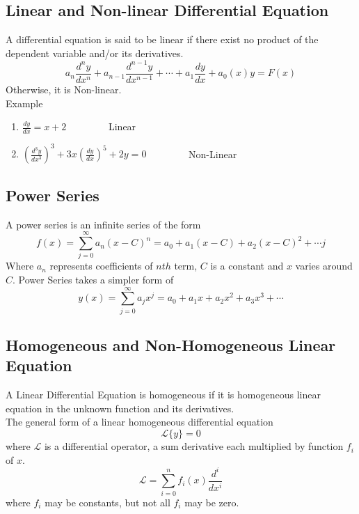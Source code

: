 \documentclass[12pt]{report}
\newcommand{\dsp}{\displaystyle}
\newcommand{\NI}{\noindent}
\begin{document}
	\subsection{Linear and Non-linear Differential Equation}
	A differential equation is said to be linear if there exist no product of the dependent variable and/or its derivatives.
	\begin{equation}
		a_n\frac{d^ny}{dx^n} + a_{n-1}\frac{d^{n-1}y}{dx^{n-1}} + \cdots + a_1\frac{dy}{dx} + a_0(x)y = F(x)
	\end{equation}
	Otherwise, it is Non-linear.\\
	Example
	\begin{enumerate}
		\item $\dsp \frac{dy}{dx} = x+2$ ~~~~~~~~Linear\\
		
		\item $\dsp \left(\frac{d^3y}{dx^3}\right)^3 + 3x\left(\frac{dy}{dx}\right)^5 + 2y = 0$ ~~~~~~~~Non-Linear
	\end{enumerate}
	
	\subsection{Power Series}
	A power series is an infinite series of the form 
	\begin{equation}
		f(x) = \sum_{j=0}^{\infty} a_n(x-C)^n = a_0 + a_1(x-C) + a_2(x-C)^2 + \cdots j
	\end{equation}
	Where $a_n$ represents coefficients of $nth$ term, $C$ is a constant and $x$ varies around $C$. Power Series takes a simpler form of
	\begin{equation}
		y(x) = \sum_{j=0}^{\infty}a_jx^j = a_0 + a_1x + a_2x^2 + a_3x^3 + \cdots
	\end{equation}
	
	\subsection{Homogeneous and Non-Homogeneous Linear Equation}
	A Linear Differential Equation is homogeneous if it is homogeneous linear equation in the unknown function and its derivatives.\\
	
	\NI The general form of a linear homogeneous differential equation
	\begin{equation}
		\mathcal{L}\{y\} = 0
	\end{equation}
	where $\mathcal{L}$ is a differential operator, a sum derivative each multiplied by function $f_i$ of $x$.
	\begin{equation}
		\mathcal{L} = \sum_{i=0}^{n} f_i(x)\frac{d^i}{dx^i}
	\end{equation}
	where $f_i$ may be constants, but not all $f_i$ may be zero.\\
	
\end{document}
